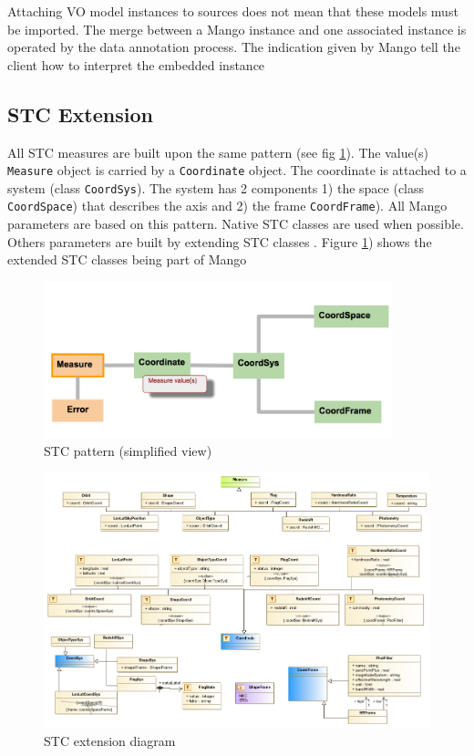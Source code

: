 \documentclass[11pt,a4paper]{ivoa}
\begin{document}
Attaching VO model instances to sources does not mean that these  models must be imported. The merge between a Mango instance and one associated instance is operated by the data annotation process. The indication given by Mango tell the client how to interpret the embedded instance

\subsection{STC Extension} 

All STC measures are built upon the same pattern (see fig \ref{fig:stcpattern}). The value(s) \texttt{Measure} object is carried by a \texttt{Coordinate} object. The coordinate is attached to a system (class \texttt{CoordSys}). The system has 2 components 1) the space  (class \texttt{CoordSpace}) that describes the axis and 2) the frame    \texttt{CoordFrame}).  All Mango parameters are based on this pattern. Native STC classes are used when possible. Others parameters are built by extending STC classes . Figure \ref{fig:stcpattern}) shows the extended STC classes being part of Mango 
\begin{figure}
     \includegraphics[width=0.9\textwidth]{stc_pattern.png}
     \caption{STC pattern (simplified view)}
     \label{fig:stcpattern}
\end{figure}

\begin{figure}
  \includegraphics[angle=90,origin=c,width=1\textwidth]{../model/stc_ext_diagram.png}
  \caption{STC extension diagram }
  \label{fig:stcextension}
\end{figure}
\end{document}
